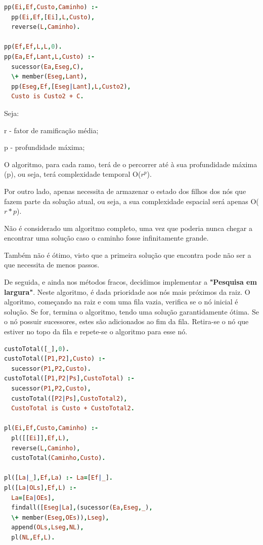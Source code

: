 \documentclass[a4paper]{article}
\begin{document}
\begin{lstlisting}[language=Prolog,xleftmargin=.15\textwidth]
pp(Ei,Ef,Custo,Caminho) :-
  pp(Ei,Ef,[Ei],L,Custo),
  reverse(L,Caminho).

pp(Ef,Ef,L,L,0).
pp(Ea,Ef,Lant,L,Custo) :-
  sucessor(Ea,Eseg,C),
  \+ member(Eseg,Lant),
  pp(Eseg,Ef,[Eseg|Lant],L,Custo2),
  Custo is Custo2 + C.
\end{lstlisting}

Seja:

r - fator de ramificação média;

p - profundidade máxima;

O algoritmo, para cada ramo, terá de o percorrer até à sua profundidade máxima (p), ou seja, terá complexidade temporal O($r ^ p$).

Por outro lado, apenas necessita de armazenar o estado dos filhos dos nós que fazem parte da solução atual, ou seja, a sua complexidade espacial será apenas O($r * p$).

Não é considerado um algoritmo completo, uma vez que poderia nunca chegar a encontrar uma solução caso o caminho fosse infinitamente grande.

Também não é ótimo, visto que a primeira solução que encontra pode não ser a que necessita de menos passos.

De seguida, e ainda nos métodos fracos, decidimos implementar a \textbf{"Pesquisa em largura"}. Neste algoritmo, é dada prioridade aos nós mais próximos da raiz. O algoritmo, começando na raiz e com uma fila vazia, verifica se o nó inicial é solução. Se for, termina o algoritmo, tendo uma solução garantidamente ótima. Se o nó possuir sucessores, estes são adicionados ao fim da fila. Retira-se o nó que estiver no topo da fila e repete-se o algoritmo para esse nó.

\begin{lstlisting}[language=Prolog,xleftmargin=.1\textwidth]
custoTotal([_],0).
custoTotal([P1,P2],Custo) :-
  sucessor(P1,P2,Custo).
custoTotal([P1,P2|Ps],CustoTotal) :-
  sucessor(P1,P2,Custo),
  custoTotal([P2|Ps],CustoTotal2),
  CustoTotal is Custo + CustoTotal2.

pl(Ei,Ef,Custo,Caminho) :-
  pl([[Ei]],Ef,L),
  reverse(L,Caminho),
  custoTotal(Caminho,Custo).

pl([La|_],Ef,La) :- La=[Ef|_].
pl([La|OLs],Ef,L) :-
  La=[Ea|OEs],
  findall([Eseg|La],(sucessor(Ea,Eseg,_),
  \+ member(Eseg,OEs)),Lseg),
  append(OLs,Lseg,NL),
  pl(NL,Ef,L).
\end{lstlisting}
\end{document}
